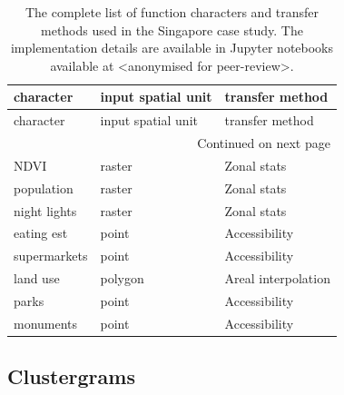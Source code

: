 \begin{longtable}{p{5cm}p{3cm}p{5cm}}
    \caption{The complete list of function characters and transfer methods used in the Singapore case study. The implementation details are available
    in Jupyter notebooks available at <anonymised for peer-review>.}
    \label{tab:fn_sin} \\
    \toprule
                                                character & input spatial unit &                                    transfer method \\
    \midrule
    \endfirsthead

    \toprule
                                                character & input spatial unit &                                    transfer method \\
    \midrule
    \endhead
    \midrule
    \multicolumn{3}{r}{{Continued on next page}} \\
    \midrule
    \endfoot

    \bottomrule
    \endlastfoot
    NDVI &  raster &         Zonal stats \\
population &  raster &         Zonal stats \\
night lights &  raster &         Zonal stats \\
eating est &   point &       Accessibility \\
supermarkets &   point &       Accessibility \\
land use & polygon & Areal interpolation \\
   parks &   point &       Accessibility \\
monuments &   point &       Accessibility \\
\end{longtable}

\normalsize

\subsection{Clustergrams}

